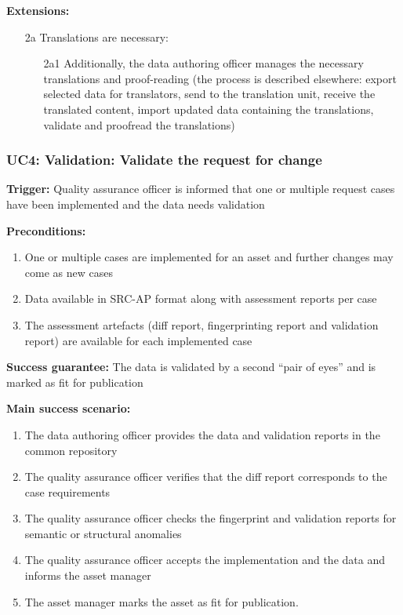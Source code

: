 	\textbf{Extensions:}
	\begin{enumerate}
		\item [2a] Translations are necessary:
		\begin{enumerate}
			\item [2a1] Additionally, the data authoring officer manages the necessary translations and proof-reading (the process is described elsewhere: export selected data for translators, send to the translation unit, receive the translated content, import updated data containing the translations, validate and proofread the translations)	
		\end{enumerate}
	\end{enumerate}
	
	\subsubsection{UC4: Validation: Validate the request for change}
	\label{sec:uc4}
	
	\textbf{Trigger:} Quality assurance officer is informed that one or multiple request cases have been implemented and the data needs validation 
	
	\textbf{Preconditions:} 
	\begin{enumerate}
	    \item One or multiple cases are implemented for an asset and further changes may come as new cases
	    \item Data available in SRC-AP \citep{src-ap-vb3} format along with assessment reports per case
	    \item The assessment artefacts (diff report, fingerprinting report and validation report) are available for each implemented case
	\end{enumerate}
	
	\textbf{Success guarantee:} The data is validated by a second ``pair of eyes'' and is marked as fit for publication
	
	\textbf{Main success scenario:} 
	
	\begin{enumerate}
		\item The data authoring officer provides the data and validation reports in the common repository 
		\item The quality assurance officer verifies that the diff report corresponds to the case requirements
		\item The quality assurance officer checks the fingerprint and validation reports for semantic or structural anomalies
		\item The quality assurance officer accepts the implementation and the data and informs the asset manager
		\item The asset manager marks the asset as fit for publication.
		
	\end{enumerate}
	

